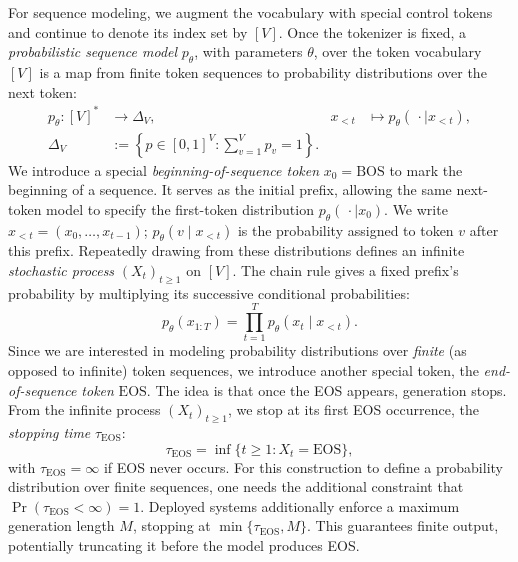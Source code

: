 \documentclass[11pt,twoside]{article}
\theoremstyle{plain}
\theoremstyle{definition}
\theoremstyle{remark}
\begin{document}
For sequence modeling, we augment the vocabulary with special control tokens
and continue to denote its index set by $[V]$.
Once the tokenizer is fixed, a \emph{probabilistic sequence model} $p_\theta$,
with parameters $\theta$, over the token vocabulary $[V]$ is a map
from finite token sequences to probability
distributions over the next token:
\begin{equation}
\begin{aligned}
p_\theta:[V]^*&\longrightarrow\Delta_V,
&x_{<t}&\longmapsto p_\theta(\,\cdot\mid x_{<t}),\\
\Delta_V&:=\left\{p\in[0,1]^V:\sum_{v=1}^V p_v=1\right\}.
\end{aligned}
\label{eq:sequence-model}
\end{equation}
We introduce a special \emph{beginning-of-sequence token}
$x_0=\mathrm{BOS}$ to mark the beginning of a sequence. It serves as the initial
prefix, allowing the same next-token model to specify the first-token
distribution $p_\theta(\,\cdot\mid x_0)$.
We write $x_{<t}=(x_0,\ldots,x_{t-1})$;
$p_\theta(v\mid x_{<t})$ is the probability assigned to token $v$ after this
prefix. Repeatedly drawing from these distributions defines an infinite
\emph{stochastic process} $(X_t)_{t\geq1}$ on $[V]$. The chain rule gives a fixed
prefix's probability by multiplying its successive conditional probabilities:
\begin{equation}
p_\theta(x_{1:T})
=\prod_{t=1}^T p_\theta(x_t\mid x_{<t}).
\label{eq:autoregressive-factorization}
\end{equation}
Since we are interested in modeling probability distributions
over \emph{finite} (as opposed to infinite) token sequences,
we introduce another special token, the \emph{end-of-sequence token} $\mathrm{EOS}$.
The idea is that once the EOS appears, generation stops.
From the infinite process $(X_t)_{t\geq1}$,
we stop at its first EOS occurrence, the \emph{stopping time} $\tau_{\mathrm{EOS}}$:
\begin{equation}
\tau_{\mathrm{EOS}}=\inf\{t\geq1:X_t=\mathrm{EOS}\},
\label{eq:eos-stopping-time}
\end{equation}
with $\tau_{\mathrm{EOS}}=\infty$ if EOS never occurs. For this construction to
define a probability distribution over finite sequences, one needs the
additional constraint that $\Pr(\tau_{\mathrm{EOS}}<\infty)=1$. Deployed systems
additionally enforce a maximum generation length $M$, stopping at
$\min\{\tau_{\mathrm{EOS}},M\}$. This guarantees finite output, potentially
truncating it before the model produces EOS.
\end{document}
